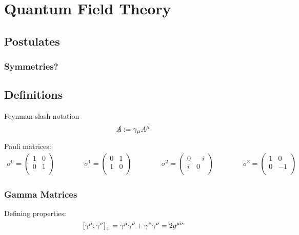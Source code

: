 \section{Quantum Field Theory} %
	\subsection{Postulates}
		\subsubsection{Symmetries?}
	\subsection{Definitions}
		Feynman slash notation
		\begin{equation}
			\slashed{A} := \gamma_\mu A^\mu
		\end{equation}

		\noindent
		Pauli matrices:
		\begin{equation}
			\begin{aligned}
				\sigma^0 = \left(\begin{matrix}
					1 & 0 \\
					0 & 1 \\
				\end{matrix}\right) &&\hspace{30pt}
				\sigma^1 = \left(\begin{matrix}
					0 & 1 \\
					1 & 0 \\
				\end{matrix}\right) &&\hspace{30pt}
				\sigma^2 = \left(\begin{matrix}
					0 & -i \\
						i & 0 \\
				\end{matrix}\right) &&\hspace{30pt}
				\sigma^3 = \left(\begin{matrix}
					1 & 0 \\
					0 & -1 \\
				\end{matrix}\right)
			\end{aligned}
		\end{equation}

		\subsubsection{Gamma Matrices}
			\noindent
			Defining properties:
			\begin{equation}
				\left[\gamma^\mu,\gamma^\nu\right]_{+} = \gamma^\mu \gamma^\nu + \gamma^\nu \gamma^\nu = 2g^{\mu\nu}
			\end{equation}

